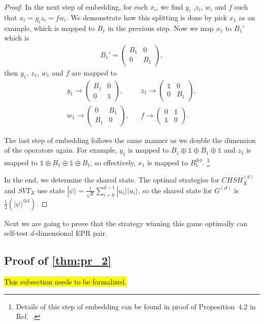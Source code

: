 \documentclass[11pt,letterpaper]{article}
\newcommand{\ket}[1]{|#1\rangle}
\newcommand{\1}{\mathbb{1}}
\newcommand{\CHSH}{CHSH^{(d)}}
\newcommand{\SVT}{SVT}
\newcommand{\G}[1]{G^{(#1)}}
\theoremstyle{definition}
\begin{document}
\begin{proof}
In the next step of embedding, for each $x_i$, we find $y_i$ ,$z_i$, $w_i$ and $f$ such that
$x_i = y_iz_i = fw_i$. We demonstrate how this splitting is done by pick $x_1$ as an example, 
which is mapped to $B_1$ in the previous step. Now we map $x_1$ to $B_1'$ which is
\begin{align}
	B_1' = \begin{pmatrix}
	B_1 & 0 \\
	0 & B_1
	\end{pmatrix},
\end{align}
then $y_1$, $z_1$, $w_1$ and $f$ are mapped to
\begin{align}
y_1 \to 
\begin{pmatrix}
B_1 & 0\\
0 & \1
\end{pmatrix},
&&
z_1 \to
\begin{pmatrix}
\1 & 0\\
0 & B_1
\end{pmatrix},
\\
w_1 \to 
\begin{pmatrix}
0 & B_1\\
B_1 & 0
\end{pmatrix},
&&
f \to
\begin{pmatrix}
0 & \1\\
\1 & 0
\end{pmatrix}.
\end{align}

The last step of embedding follows the same manner as we double the dimension of the operators again.
For example, $y_1$ is mapped to $B_1 \oplus \1 \oplus B_1 \oplus \1$ and $z_1$ is mapped to 
$\1 \oplus B_1 \oplus \1 \oplus B_1$, so effectively, $x_1$ is mapped to $B_1^{\oplus 4}$.
\footnote{Details of this step of embedding can be found in proof of Proposition~$4.2$ in Ref.~\cite{slofstra2017}.}

In the end, we determine the shared state.
The optimal strategies for $\CHSH_X$ and $\SVT_X$ use state 
$\ket{\psi} = \frac{1}{\sqrt{d}} \sum_{i=0}^{d-1} \ket{u_i}\ket{u_i}$, 
so the shared state for $\G{d}$ is $\frac{1}{2}( \ket{\psi}^{\oplus 4})$.
\end{proof}
Next we are going to prove that the strategy winning this game optimally can self-test $d$-dimensional EPR pair.

\subsection{Proof of \cref{thm:pr_2}}
\hl{This subsection needs to be formalized.}
\end{document}

